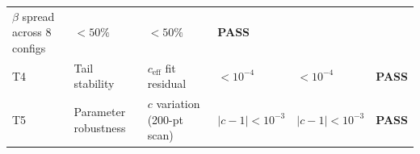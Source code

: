 \documentclass[
  11pt,
]{article}
\begin{document}
\begin{longtable}[]{@{}llllll@{}}
\begin{minipage}[t]{0.14\columnwidth}
\(\beta\) spread across 8 configs\strut
\end{minipage} & \begin{minipage}[t]{0.14\columnwidth}\raggedright
\(< 50\%\)\strut
\end{minipage} & \begin{minipage}[t]{0.14\columnwidth}\raggedright
\(< 50\%\)\strut
\end{minipage} & \begin{minipage}[t]{0.14\columnwidth}\raggedright
\textbf{PASS}\strut
\end{minipage}\tabularnewline
\begin{minipage}[t]{0.14\columnwidth}\raggedright
T4\strut
\end{minipage} & \begin{minipage}[t]{0.14\columnwidth}\raggedright
Tail stability\strut
\end{minipage} & \begin{minipage}[t]{0.14\columnwidth}\raggedright
\(c_\text{eff}\) fit residual\strut
\end{minipage} & \begin{minipage}[t]{0.14\columnwidth}\raggedright
\(< 10^{-4}\)\strut
\end{minipage} & \begin{minipage}[t]{0.14\columnwidth}\raggedright
\(< 10^{-4}\)\strut
\end{minipage} & \begin{minipage}[t]{0.14\columnwidth}\raggedright
\textbf{PASS}\strut
\end{minipage}\tabularnewline
\begin{minipage}[t]{0.14\columnwidth}\raggedright
T5\strut
\end{minipage} & \begin{minipage}[t]{0.14\columnwidth}\raggedright
Parameter robustness\strut
\end{minipage} & \begin{minipage}[t]{0.14\columnwidth}\raggedright
\(c\) variation (200-pt scan)\strut
\end{minipage} & \begin{minipage}[t]{0.14\columnwidth}\raggedright
\(\lvert c - 1\rvert < 10^{-3}\)\strut
\end{minipage} & \begin{minipage}[t]{0.14\columnwidth}\raggedright
\(\lvert c - 1\rvert < 10^{-3}\)\strut
\end{minipage} & \begin{minipage}[t]{0.14\columnwidth}\raggedright
\textbf{PASS}\strut
\end{minipage}\tabularnewline
\bottomrule
\end{longtable}
\end{document}

